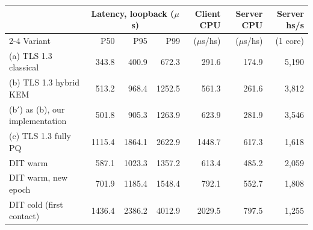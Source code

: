 \begin{tabular}{lrrrrrr}
\toprule
 & \multicolumn{3}{c}{Latency, loopback ($\mu$s)} & Client CPU & Server CPU & Server hs/s \\
\cmidrule(lr){2-4}
Variant & P50 & P95 & P99 & ($\mu$s/hs) & ($\mu$s/hs) & (1 core) \\
\midrule
(a) TLS 1.3 classical & 343.8 & 400.9 & 672.3 & 291.6 & 174.9 & 5{,}190 \\
(b) TLS 1.3 hybrid KEM & 513.2 & 968.4 & 1252.5 & 561.3 & 261.6 & 3{,}812 \\
(b$'$) as (b), our implementation & 501.8 & 905.3 & 1263.9 & 623.9 & 281.9 & 3{,}546 \\
(c) TLS 1.3 fully PQ & 1115.4 & 1864.1 & 2622.9 & 1448.7 & 617.3 & 1{,}618 \\
DIT warm & 587.1 & 1023.3 & 1357.2 & 613.4 & 485.2 & 2{,}059 \\
DIT warm, new epoch & 701.9 & 1185.4 & 1548.4 & 792.1 & 552.7 & 1{,}808 \\
DIT cold (first contact) & 1436.4 & 2386.2 & 4012.9 & 2029.5 & 797.5 & 1{,}255 \\
\bottomrule
\end{tabular}
